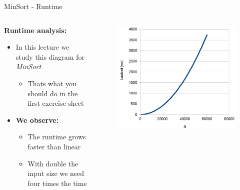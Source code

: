 
\begin{frame}{MinSort - Runtime}
  \begin{columns}%
    \begin{column}{0.5\textwidth}%
      \textbf{Runtime analysis:}
      \begin{itemize}
        \item
          In this lecture we study this diagram for \textit{MinSort}
          \begin{itemize}
            \item
              Thats what you should do in the first exercise sheet
          \end{itemize}
        \item
          \textbf{We observe:}\\
          \begin{itemize}
            \item
              The runtime {\color{Mittel-Blau}grows faster than linear}
            \item
              With double the input size we need four times the time
          \end{itemize}
      \end{itemize}
    \end{column}%
    \begin{column}{0.5\textwidth}%
      \begin{center}%
        \begin{figure}%
          \includegraphics[width=\textwidth]{Images/MinSort/RuntimeSquared.png}%

\end{figure}
\end{center}
\end{column}
\end{columns}
\end{frame}
